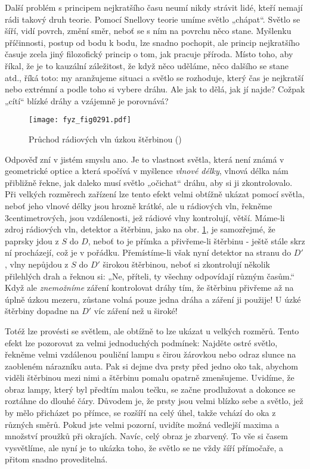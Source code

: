     Další problém s principem nejkratšího času neumí nikdy strávit lidé, kteří nemají rádi takový 
    druh teorie. Pomocí Snellovy teorie umíme světlo „chápat“. Světlo se šíří, vidí povrch, změní 
    směr, neboť se s ním na povrchu něco stane. Myšlenku příčinnosti, postup od bodu k bodu, lze 
    snadno pochopit, ale princip nejkratšího časuje zcela jiný filozofický princip o tom, jak 
    pracuje příroda. Místo toho, aby říkal, že je to kauzální záležitost, že když něco uděláme, 
    něco dalšího se stane atd., říká toto: my aranžujeme situaci a světlo se rozhoduje, který čas 
    je nejkratší nebo extrémní a podle toho si vybere dráhu. Ale jak to dělá, jak jí najde? Cožpak 
    „cítí“ blízké dráhy a vzájemně je porovnává?
    
    \begin{figure}[ht!] %
      \centering
      \texttt{[image: fyz\_fig0291.pdf]}
      \caption{Průchod rádiových vln úzkou štěrbinou
               (\cite[s.~354]{Feynman01})}
      \label{fyz:fig0291}
    \end{figure}
    
    Odpověď zní v jistém smyslu ano. Je to vlastnost světla, která není známá v geometrické optice 
    a která spočívá v myšlence \emph{vlnové délky}, vlnová délka nám přibližně řekne, jak daleko 
    musí světlo „očichat“ dráhu, aby si ji zkontrolovalo. Při velkých rozměrech zařízení lze tento 
    efekt velmi obtížně ukázat pomocí světla, neboť jeho vlnové délky jsou hrozně krátké, ale u 
    rádiových vln, řekněme 3centimetrových, jsou vzdálenosti, jež rádiové vlny kontrolují, větší. 
    Máme-li zdroj rádiových vln, detektor a štěrbinu, jako na obr. \ref{fyz:fig0291}, je samozřejmé, 
    že paprsky jdou z \(S\) do \(D\), neboť to je přímka a přivřeme-li štěrbinu - ještě stále skrz 
    ní procházejí, což je v pořádku. Přemístíme-li však nyní detektor na stranu do \(D'\), vlny 
    nepůjdou z \(S\) do \(D'\) širokou štěrbinou, neboť si zkontrolují několik přilehlých drah a 
    řeknou si: „Ne, příteli, ty všechny odpovídají různým časům.“ Když ale \emph{znemožníme} záření 
    kontrolovat dráhy tím, že štěrbinu přivřeme až na úplně úzkou mezeru, zůstane volná pouze jedna 
    dráha a záření ji použije! U úzké štěrbiny dopadne na \(D'\) víc záření než u široké!
    
    Totéž lze provésti se světlem, ale obtížně to lze ukázat u velkých rozměrů. Tento efekt lze 
    pozorovat za velmi jednoduchých podmínek: Najděte ostré světlo, řekněme velmi vzdálenou 
    pouliční lampu s čirou žárovkou nebo odraz slunce na zaobleném nárazníku auta. Pak si dejme dva 
    prsty před jedno oko tak, abychom viděli štěrbinou mezi nimi a štěrbinu pomalu opatrně 
    zmenšujeme. Uvidíme, že obraz lampy, který byl předtím malou tečku, se začne prodlužovat a 
    dokonce se roztáhne do dlouhé čáry. Důvodem je, že prsty jsou velmi blízko sebe a světlo, jež 
    by mělo přicházet po přímce, se rozšíří na celý úhel, takže vchází do oka z různých směrů. 
    Pokud jste velmi pozorní, uvidíte možná vedlejší maxima a množství proužků při okrajích. Navíc, 
    celý obraz je zbarvený. To vše si časem vysvětlíme, ale nyní je to ukázka toho, že světlo se ne 
    vždy šíří přímočaře, a přitom snadno proveditelná.
    
